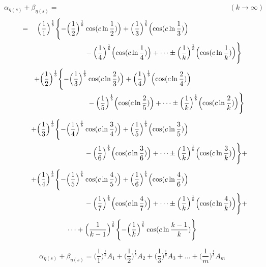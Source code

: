 \documentclass{amsart}
\begin{document}
	\[ \alpha_{\eta(s)} + \beta_{\eta(s)} = \qquad\qquad\qquad\qquad\qquad\qquad\qquad\qquad\qquad\qquad\qquad\qquad (k \to \infty) \]
	\[
	\begin{aligned}
		= \quad \Bigl( \frac{1}{1} \Bigr)^\frac1b \Biggl\{ -\Bigl( \frac{1}{2} \Bigr)^\frac1b &\cos(c \ln \frac{1}{2}) \Bigr) + \Bigl( \frac{1}{3} \Bigr)^\frac1b \Bigl( \cos(c \ln \frac{1}{3}) \Bigr) \\
		& -\Bigl( \frac{1}{4} \Bigr)^\frac1b \Bigl( \cos(c \ln \frac{1}{4}) \Bigr) + \dots \pm \Bigl( \frac{1}{k} \Bigr)^\frac1b \Bigl( \cos(c \ln \frac{1}{k}) \Bigr) \Biggr\} 
	\end{aligned}
	\]
	\[
	\begin{aligned}
		\quad\quad +\Bigl( \frac{1}{2} \Bigr)^\frac1b \Biggl\{ -\Bigl( \frac{1}{3} \Bigr)^\frac1b &\cos(c \ln \frac{2}{3}) \Bigr) + \Bigl( \frac{1}{4} \Bigr)^\frac1b \Bigl( \cos(c \ln \frac{2}{4}) \Bigr) \\
		& -\Bigl( \frac{1}{5} \Bigr)^\frac1b \Bigl( \cos(c \ln \frac{2}{5}) \Bigr) + \dots \pm \Bigl( \frac{1}{k} \Bigr)^\frac1b \Bigl( \cos(c \ln \frac{2}{k}) \Bigr) \Biggr\}
	\end{aligned}
	\]
	\[
	\begin{aligned}
		\quad\quad +\Bigl( \frac{1}{3} \Bigr)^\frac1b \Biggl\{ -\Bigl( \frac{1}{4} \Bigr)^\frac1b &\cos(c \ln \frac{3}{4}) \Bigr) + \Bigl( \frac{1}{5} \Bigr)^\frac1b \Bigl( \cos(c \ln \frac{3}{5}) \Bigr) \\
		& -\Bigl( \frac{1}{6} \Bigr)^\frac1b \Bigl( \cos(c \ln \frac{3}{6}) \Bigr) + \dots \pm \Bigl( \frac{1}{k} \Bigr)^\frac1b \Bigl( \cos(c \ln \frac{3}{k}) \Bigr) \Biggr\} + 
	\end{aligned}
	\]
	\[
	\begin{aligned}
		\quad\quad +\Bigl( \frac{1}{4} \Bigr)^\frac1b \Biggl\{ -\Bigl( \frac{1}{5} \Bigr)^\frac1b &\cos(c \ln \frac{4}{5}) \Bigr) + \Bigl( \frac{1}{6} \Bigr)^\frac1b \Bigl( \cos(c \ln \frac{4}{6}) \Bigr) \\
		& -\Bigl( \frac{1}{7} \Bigr)^\frac1b \Bigl( \cos(c \ln \frac{4}{7}) \Bigr) + \dots \pm \Bigl( \frac{1}{k} \Bigr)^\frac1b \Bigl( \cos(c \ln \frac{4}{k}) \Bigr) \Biggr\} + 
	\end{aligned}
	\]
	\[ \dots + \Bigl( \frac{1}{k-1} \Bigr)^\frac1b \Biggl\{ -\Bigl( \frac{1}{k} \Bigr)^\frac1b \cos(c \ln \frac{k-1}{k}) \Biggr\} \]
	
	\[ \alpha_{\eta(s)} + \beta_{\eta(s)} = \Big(\frac{1}{1}\Big)^{\frac{1}{b}}A_1 + \Big(\frac{1}{2}\Big)^{\frac{1}{b}}A_2 + \Big(\frac{1}{3}\Big)^{\frac{1}{b}}A_3 + \dots + \Big(\frac{1}{m}\Big)^{\frac{1}{b}}A_m \]
	
\end{document}
